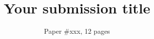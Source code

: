 \documentclass[sigconf, screen]{acmart}
\begin{document}
\title{Your submission title}
\subtitle{Paper \#xxx, 12 pages}


\maketitle






% 
% 
% 
% 
% 
% 
% 




% 


% 
\end{document}
